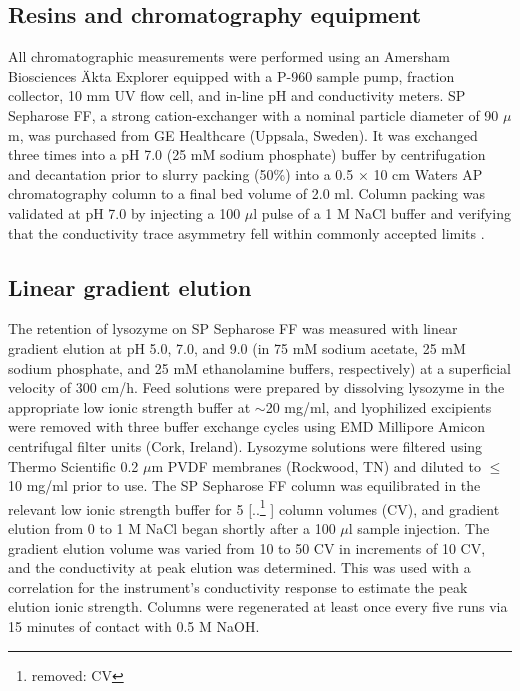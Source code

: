 \documentclass[preprint,review,12pt]{elsarticle}
\providecommand{\DIFaddtex}[1]{{\protect\color{blue} \sf #1}} %
\providecommand{\DIFdeltex}[1]{{\protect\color{red} [..\footnote{removed: #1} ]}} %
\providecommand{\DIFaddbegin}{} %
\providecommand{\DIFaddend}{} %
\providecommand{\DIFdelbegin}{} %
\providecommand{\DIFdelend}{} %
\providecommand{\DIFadd}[1]{\texorpdfstring{\DIFaddtex{#1}}{#1}} %
\providecommand{\DIFdel}[1]{\texorpdfstring{\DIFdeltex{#1}}{}} %
\begin{document}
    \subsection{Resins and chromatography equipment} \label{ssec:equip}
        All chromatographic measurements were performed using an Amersham Biosciences \"{A}kta Explorer equipped with a P-960 sample pump, fraction collector, 10 mm UV flow cell, and in-line pH and conductivity meters. SP Sepharose FF, a strong cation-exchanger \DIFaddbegin \DIFadd{with a nominal particle diameter of 90 $\mu$m}\DIFaddend , was purchased from GE Healthcare (Uppsala, Sweden). It was exchanged three times into a pH 7.0 (25 mM sodium phosphate) buffer by centrifugation and decantation prior to slurry packing (50\%) into a 0.5 $\times$ 10 cm Waters AP chromatography column to a final bed volume of 2.0 ml. Column packing was validated at pH 7.0 by injecting a 100 $\mu$l pulse of a 1 M NaCl buffer and verifying that the conductivity trace asymmetry fell within commonly accepted limits \cite{Carta2010a}.

    \subsection{Linear gradient elution} \label{ssec:lge}
        The retention of lysozyme on SP Sepharose FF was measured with linear gradient elution at pH 5.0, 7.0, and 9.0 (in 75 mM sodium acetate, 25 mM sodium phosphate, and 25 mM ethanolamine buffers, respectively) at a superficial velocity of 300 cm/h. Feed solutions were prepared by dissolving lysozyme in the appropriate low ionic strength buffer at $\sim$20 mg/ml, and lyophilized excipients were removed with three buffer exchange cycles using EMD Millipore Amicon centrifugal filter units (Cork, Ireland). Lysozyme solutions were filtered using Thermo Scientific 0.2 $\mu$m PVDF membranes (Rockwood, TN) and diluted to $\leq$ 10 mg/ml prior to use. The SP Sepharose FF column was equilibrated in the relevant low ionic strength buffer for 5 \DIFdelbegin \DIFdel{CV}\DIFdelend \DIFaddbegin \DIFadd{column volumes (CV)}\DIFaddend , and gradient elution from 0 to 1 M NaCl began shortly after a 100 $\mu$l sample injection. The gradient elution volume was varied from 10 to 50 CV in increments of 10 CV, and the conductivity at peak elution was determined. This was used with a correlation for the instrument's conductivity response to estimate the peak elution ionic strength. Columns were regenerated at least once every five runs via 15 minutes of contact with 0.5 M NaOH.
\end{document}
